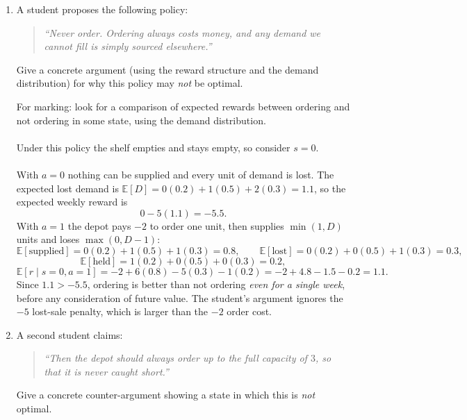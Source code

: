 \begin{enumerate}
\begin{solution}
\begin{itemize}
  \item $a=2 \Rightarrow y=3$: $s' = 3,2,1$ with probabilities $0.2, 0.5, 0.3$.
\end{itemize}
Marking scheme: 1 mark per action. The most common error is to give $a=0$ four outcomes or to
assign $\textsf{pr}[s'=0]=0.5$, missing that lost demand collapses $D=1$ and $D=2$ onto the same
next state.
\end{solution}
\clearpage
\item \points[2] A student proposes the following policy:
\begin{quote}
  \emph{``Never order. Ordering always costs money, and any demand we cannot fill is simply
  sourced elsewhere.''}
\end{quote}
Give a concrete argument (using the reward structure and the demand distribution) for why
this policy may \emph{not} be optimal.
\begin{solution}
For marking: look for a comparison of expected rewards between ordering and not ordering in
some state, using the demand distribution.
\\~\\
Under this policy the shelf empties and stays empty, so consider $s=0$.
\\~\\
With $a=0$ nothing can be supplied and every unit of demand is lost. The expected lost demand is
$\mathbb{E}[D] = 0(0.2)+1(0.5)+2(0.3) = 1.1$, so the expected weekly reward is
\[
0 - 5(1.1) = -5.5.
\]
With $a=1$ the depot pays $-2$ to order one unit, then supplies $\min(1,D)$ units and loses
$\max(0,D-1)$:
\[
\mathbb{E}[\text{supplied}] = 0(0.2)+1(0.5)+1(0.3) = 0.8, \qquad
\mathbb{E}[\text{lost}] = 0(0.2)+0(0.5)+1(0.3) = 0.3,
\]
\[
\mathbb{E}[\text{held}] = 1(0.2)+0(0.5)+0(0.3) = 0.2,
\]
\[
\mathbb{E}[r \mid s=0,a=1] = -2 + 6(0.8) - 5(0.3) - 1(0.2) = -2 + 4.8 - 1.5 - 0.2 = 1.1.
\]
Since $1.1 > -5.5$, ordering is better than not ordering \emph{even for a single week}, before
any consideration of future value. The student's argument ignores the $-5$ lost-sale penalty,
which is larger than the $-2$ order cost.
\end{solution}
\vspace{60pt}
\item \points[2] A second student claims:
\begin{quote}
  \emph{``Then the depot should always order up to the full capacity of $3$, so that it is never
  caught short.''}
\end{quote}
Give a concrete counter-argument showing a state in which this is \emph{not} optimal.

\end{enumerate}
